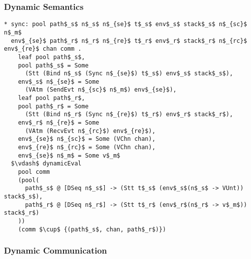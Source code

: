 \documentclass{beamer}
\begin{document}
\begin{frame}[fragile]
	\frametitle{Dynamic Semantics}
\begin{lstlisting}[language=logic, mathescape]
* sync: pool path$_s$ n$_s$ n$_{se}$ t$_s$ env$_s$ stack$_s$ n$_{sc}$ n$_m$
  env$_{se}$ path$_r$ n$_r$ n$_{re}$ t$_r$ env$_r$ stack$_r$ n$_{rc}$ env$_{re}$ chan comm .
    leaf pool path$_s$,
    pool path$_s$ = Some
      (Stt (Bind n$_s$ (Sync n$_{se}$) t$_s$) env$_s$ stack$_s$),
    env$_s$ n$_{se}$ = Some
      (VAtm (SendEvt n$_{sc}$ n$_m$) env$_{se}$),
    leaf pool path$_r$,
    pool path$_r$ = Some
      (Stt (Bind n$_r$ (Sync n$_{re}$) t$_r$) env$_r$ stack$_r$),
    env$_r$ n$_{re}$ = Some
      (VAtm (RecvEvt n$_{rc}$) env$_{re}$),
    env$_{se}$ n$_{sc}$ = Some (VChn chan),
    env$_{re}$ n$_{rc}$ = Some (VChn chan), 
    env$_{se}$ n$_m$ = Some v$_m$
  $\vdash$ dynamicEval
    pool comm
    (pool(
      path$_s$ @ [DSeq n$_s$] -> (Stt t$_s$ (env$_s$(n$_s$ -> VUnt)) stack$_s$), 
      path$_r$ @ [DSeq n$_r$] -> (Stt t$_r$ (env$_r$(n$_r$ -> v$_m$)) stack$_r$)
    )) 
    (comm $\cup$ {(path$_s$, chan, path$_r$)})
\end{lstlisting}
\end{frame}

\begin{frame}[fragile]
	\frametitle{Dynamic Communication}
\begin{lstlisting}[language=logic, mathescape]
  
\end{lstlisting}
\end{frame}
\end{document}
